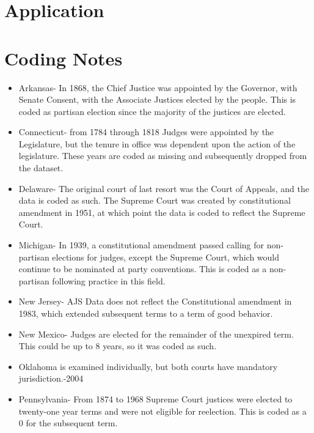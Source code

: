 \documentclass[12pt]{article}
\begin{document}
\section*{Application}



\singlespacing


\appendix
\section{Coding Notes}\label{CodingNotes}
\begin{itemize}
	\item Arkansas- In 1868, the Chief Justice was appointed by the Governor, with Senate Consent, with the Associate Justices elected by the people.  This is coded as partisan election since the majority of the justices are elected.
	
	\item Connecticut- from 1784 through 1818 Judges were appointed by the Legislature, but the tenure in office was dependent upon the action of the legislature.  These years are coded as missing and subsequently dropped from the dataset.
	
	\item Delaware- The original court of last resort was the Court of Appeals, and the data is coded as such.  The Supreme Court was created by constitutional amendment in 1951, at which point the data is coded to reflect the Supreme Court.
	
	\item Michigan- In 1939, a constitutional amendment passed calling for non-partisan elections for judges, except the Supreme Court, which would continue to be nominated at party conventions.  This is coded as a non-partisan following practice in this field.
	
	\item New Jersey- AJS Data does not reflect the Constitutional amendment in 1983, which extended subsequent terms to a term of good behavior.
	
	\item New Mexico- Judges are elected for the remainder of the unexpired term.  This could be up to 8 years, so it was coded as such.
	
	\item Oklahoma is examined individually, but both courts have mandatory jurisdiction.-2004
	
	\item Pennsylvania- From 1874 to 1968 Supreme Court justices were elected to twenty-one year terms and were not eligible for reelection.  This is coded as a 0 for the subsequent term.
	

\end{itemize}
\end{document}
